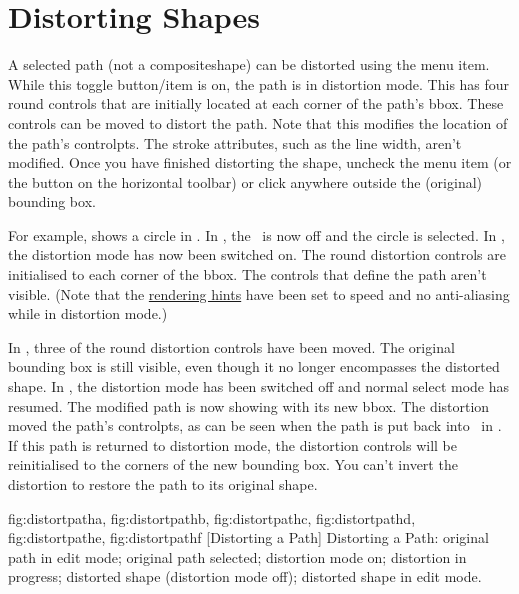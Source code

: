 
\section{Distorting Shapes}\label{sec:distort}


A selected \gls{path} (not a \gls{compositeshape}) can be distorted using the
 menu item. While this toggle
button\slash item is on, the \gls{path} is in distortion mode.
This has four round controls that are initially located at each
corner of the path's \gls{bbox}. These controls can be moved to
distort the path.  Note that this modifies the location of the
path's \glspl{controlpt}. The stroke attributes, such as the line
width, aren't modified. Once you have finished distorting the shape,
uncheck the  menu item (or the
button on the horizontal \gls{toolbar}) or click
anywhere outside the (original) bounding box.

For example,  shows a circle in 
\editpathmode. In , the \editpathmode\ is now off and
the circle is selected. In , the
distortion mode has now been switched on. The round distortion
controls are initialised to each corner of the \gls{bbox}. The
controls that define the path aren't visible. (Note that the
\hyperref[sec:graphics]{rendering hints} have been set to speed
and no anti-aliasing while in distortion mode.)

In , three of the round distortion
controls have been moved. The original bounding box is still
visible, even though it no longer encompasses the distorted shape.
In , the distortion mode has been
switched off and normal select mode has resumed. The modified path
is now showing with its new \gls{bbox}. The distortion moved the
path's \glspl{controlpt}, as can be seen when the path is put back into
\editpathmode\ in . If this path is
returned to distortion mode, the distortion controls will be reinitialised to
the corners of the new bounding box. You can't invert the distortion
to restore the path to its original shape.

{
  {fig:distortpatha}{}{},
  {fig:distortpathb}{}{},
  {fig:distortpathc}{}{},
  {fig:distortpathd}{}{},
  {fig:distortpathe}{}{},
  {fig:distortpathf}{}{}
}
[Distorting a Path]
{Distorting a Path: 
 original path in edit mode;
 original path selected;
 distortion mode on;
 distortion in progress;
 distorted shape (distortion mode off);
 distorted shape in edit mode.}

